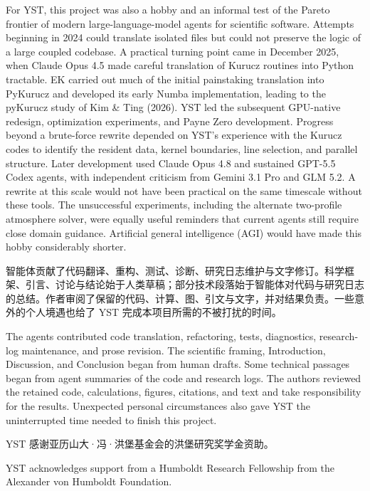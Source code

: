 \begin{EN}
For YST, this project was also a hobby and an informal test of the Pareto
frontier of modern large-language-model agents for scientific software.
Attempts beginning in
2024 could translate isolated files
but could not preserve the logic of a large coupled codebase. A practical
turning point came in December 2025, when Claude Opus 4.5 made careful
translation of Kurucz routines into Python tractable. EK carried out much of
the initial painstaking translation into PyKurucz and developed its early
Numba implementation, leading to the pyKurucz study of Kim \& Ting (2026).
YST led the subsequent GPU-native
redesign, optimization experiments, and Payne Zero development. Progress
beyond a brute-force rewrite depended on YST's experience with the Kurucz codes
to identify the resident data, kernel boundaries, line selection, and parallel
structure. Later development used Claude Opus 4.8 and sustained GPT-5.5 Codex
agents, with independent criticism from Gemini 3.1 Pro and GLM 5.2. A rewrite
at this scale would not have been practical on the same timescale without these
tools. The unsuccessful experiments, including the alternate two-profile
atmosphere solver, were equally useful reminders that current agents still
require close domain guidance. Artificial general intelligence (AGI) would
have made this hobby considerably shorter.
\end{EN}

智能体贡献了代码翻译、重构、测试、诊断、研究日志维护与文字修订。科学框架、引言、讨论与结论始于人类草稿；部分技术段落始于智能体对代码与研究日志的总结。作者审阅了保留的代码、计算、图、引文与文字，并对结果负责。一些意外的个人境遇也给了 YST 完成本项目所需的不被打扰的时间。

\begin{EN}
The agents contributed code translation, refactoring, tests, diagnostics,
research-log maintenance, and prose revision. The scientific framing,
Introduction, Discussion, and Conclusion began from human drafts. Some
technical passages began from agent summaries of the code and research logs.
The authors reviewed the retained code, calculations, figures, citations, and
text and take responsibility for the results. Unexpected personal
circumstances also gave YST the uninterrupted time needed to finish this
project.
\end{EN}

YST 感谢亚历山大·冯·洪堡基金会的洪堡研究奖学金资助。

\begin{EN}
YST acknowledges support from a Humboldt Research Fellowship from the
Alexander von Humboldt Foundation.
\end{EN}

